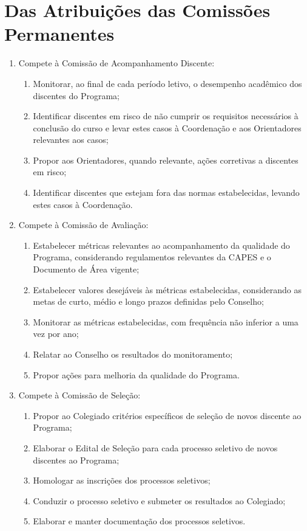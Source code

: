 \documentclass{article}
\newcommand{\grupoMenor}{Colegiado\xspace}
\newcommand{\grupoMaior}{Conselho\xspace}
\begin{document}
\section{Das Atribuições das Comissões Permanentes}
\begin{enumerate}
	\item Compete à Comissão de Acompanhamento Discente:
	\begin{enumerate}[label=\Roman*]
		\item Monitorar, ao final de cada período letivo, o desempenho acadêmico dos discentes do Programa;
		\item Identificar discentes em risco de não cumprir os requisitos necessários à conclusão do curso e levar estes casos à Coordenação e aos Orientadores relevantes aos casos;
		\item Propor aos Orientadores, quando relevante, ações corretivas a discentes em risco;
		\item Identificar discentes que estejam fora das normas estabelecidas, levando estes casos à Coordenação.
	\end{enumerate}

	\item Compete à Comissão de Avaliação:
	\begin{enumerate}[label=\Roman*]
		\item Estabelecer métricas relevantes ao acompanhamento da qualidade do Programa, considerando regulamentos relevantes da CAPES e o Documento de Área vigente;
		\item Estabelecer valores desejáveis às métricas estabelecidas, considerando as metas de curto, médio e longo prazos definidas pelo \grupoMaior;
		\item Monitorar as métricas estabelecidas, com frequência não inferior a uma vez por ano;
		\item Relatar ao \grupoMaior os resultados do monitoramento;
		\item Propor ações para melhoria da qualidade do Programa.
	\end{enumerate}

	\item Compete à Comissão de Seleção:
	\begin{enumerate}[label=\Roman*]
		\item Propor ao \grupoMenor critérios específicos de seleção de novos discente ao Programa;
		\item Elaborar o Edital de Seleção para cada processo seletivo de novos discentes ao Programa;
		\item Homologar as inscrições dos processos seletivos;
		\item Conduzir o processo seletivo e submeter os resultados ao \grupoMenor;
		\item Elaborar e manter documentação dos processos seletivos.
	\end{enumerate}
\end{enumerate}
\end{document}
